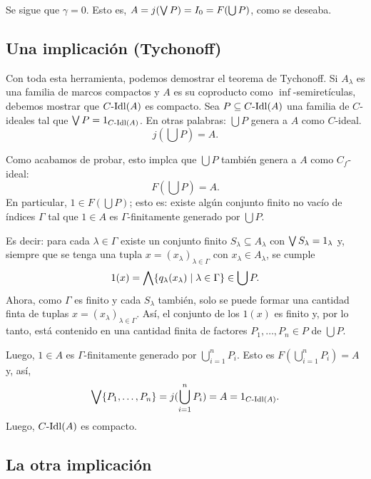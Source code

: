     Se sigue que $\gamma=0$.
    Esto es, $A=j(\bigvee P) = I_0 = F(\bigcup P)$, como se deseaba.

\subsection{Una implicación (Tychonoff)}
    Con toda esta herramienta, podemos demostrar el teorema
    de Tychonoff.
    Si $A_\lambda$ es una familia de marcos compactos y $A$
    es su coproducto como $\inf$-semiretículas,
    debemos mostrar que $C\text{-}\mathrm{Idl}(A)$ es compacto.
    Sea $P\subseteq C\text{-}\mathrm{Idl}(A)$ una familia de $C$-ideales tal que
    $\bigvee P = 1_{C\text{-}\mathrm{Idl}(A)}$.
    En otras palabras: $\bigcup P$ genera a $A$ como $C$-ideal.
    \[
        j(\bigcup P) = A
    .\]
    
    Como acabamos de probar, esto implca que $\bigcup P$ también
    genera a $A$ como $C_f$-ideal:
    \[
        F(\bigcup P)=A
    .\]
    En particular, $1\in F(\bigcup P)$; esto es:
    existe algún conjunto finito no vacío de índices $\Gamma$
    tal que $1\in A$ es $\Gamma$-finitamente generado por
    $\bigcup P$.

    Es decir: para cada $\lambda\in\Gamma$ existe un conjunto
    finito $S_\lambda\subseteq A_\lambda$
    con $\bigvee S_\lambda = 1_\lambda$
    y, siempre que se tenga una tupla
    $x=(x_\lambda)_{\lambda\in\Gamma}$
    con $x_\lambda\in A_\lambda$,
    se cumple
    \[
        1(x)
        =\bigwedge\{q_\lambda(x_\lambda)\mid\lambda\in\Gamma\}
        \in\bigcup P
    .\]
    Ahora, como $\Gamma$ es finito y cada $S_\lambda$
    también, solo se puede formar
    una cantidad finta de tuplas
    $x=(x_\lambda)_{\lambda\in\Gamma}$.
    Así, el conjunto de los $1(x)$ es finito y, por lo tanto,
    está contenido en una cantidad finita de factores
    $P_1,\dots,P_n\in P$ de $\bigcup P$.
    
    Luego, $1\in A$ es $\Gamma$-finitamente generado
    por $\bigcup_{i=1}^nP_i$.
    Esto es $F(\bigcup_{i=1}^n P_i)=A$ y, así,
    \[
        \bigvee\{P_1,\dots,P_n\}
        = j(\bigcup_{i=1}^nP_i)
        = A
        = 1_{C\text{-}\mathrm{Idl}(A)}
    .\]
    Luego, $C\text{-}\mathrm{Idl}(A)$ es compacto.


\subsection{La otra implicación}

